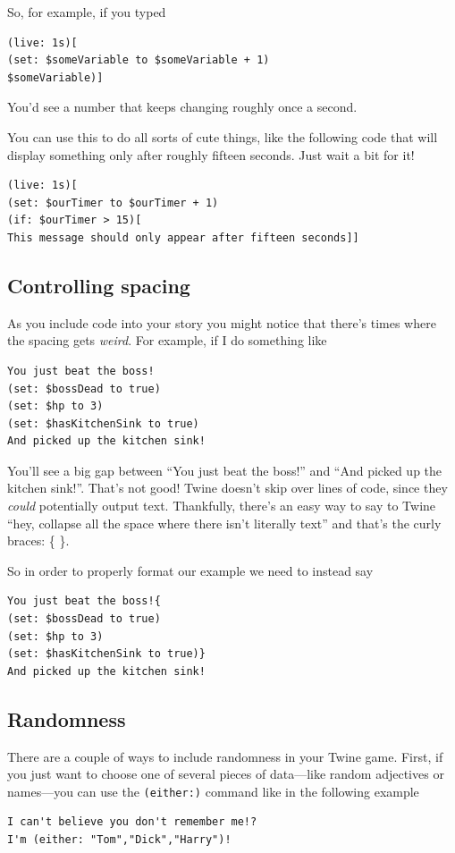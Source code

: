 \documentclass[a5paper,11pt]{article}
\begin{document}
So, for example, if you typed
\begin{verbatim}
(live: 1s)[
(set: $someVariable to $someVariable + 1)
$someVariable)]
\end{verbatim}
You'd see a number that keeps changing roughly once a second.

You can use this to do all sorts of cute things, like the following code that will display something only after roughly fifteen seconds. Just wait a bit for it!
\begin{verbatim}
(live: 1s)[
(set: $ourTimer to $ourTimer + 1)
(if: $ourTimer > 15)[
This message should only appear after fifteen seconds]]
\end{verbatim}
\subsection{Controlling spacing}
As you include code into your story you might notice that there's times where the spacing gets \emph{weird}. For example, if I do something like

\begin{verbatim}
You just beat the boss!
(set: $bossDead to true)
(set: $hp to 3)
(set: $hasKitchenSink to true)
And picked up the kitchen sink!
\end{verbatim}

You'll see a big gap between ``You just beat the boss!'' and ``And picked up the kitchen sink!''. That's not good! Twine doesn't skip over lines of code, since they \emph{could} potentially output text. Thankfully, there's an easy way to say to Twine ``hey, collapse all the space where there isn't literally text'' and that's the curly braces: \{ \}.

So in order to properly format our example we need to instead say
\begin{verbatim}
You just beat the boss!{
(set: $bossDead to true)
(set: $hp to 3)
(set: $hasKitchenSink to true)}
And picked up the kitchen sink!
\end{verbatim}

\subsection{Randomness}
There are a couple of ways to include randomness in your Twine game. First, if you just want to choose one of several pieces of data---like random adjectives or names---you can use the \verb|(either:)| command like in the following example
\begin{verbatim}
I can't believe you don't remember me!? 
I'm (either: "Tom","Dick","Harry")!
\end{verbatim}
\end{document}
